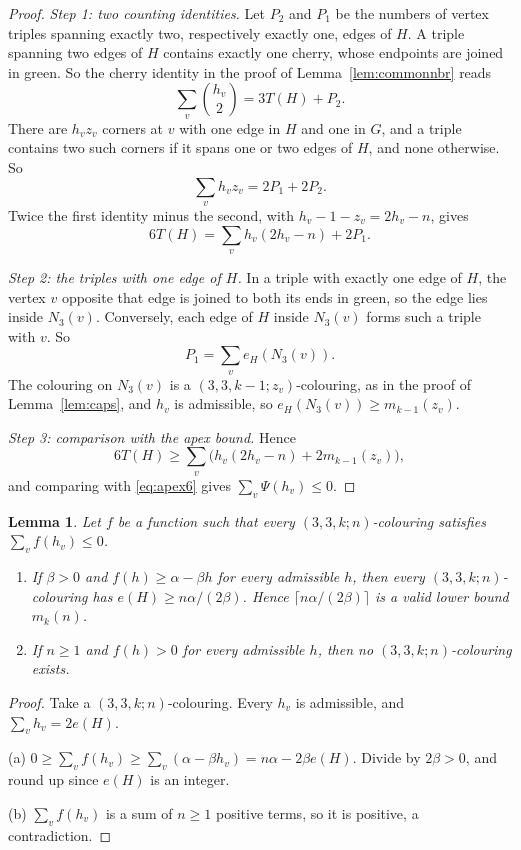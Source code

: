\documentclass[11pt]{article}
\theoremstyle{spacedplain}
\newtheorem{lemma}[theorem]{Lemma}
\theoremstyle{spaceddef}
\theoremstyle{spacedremark}
\begin{document}
\begin{proof}
\emph{Step 1: two counting identities.}
Let $P_2$ and $P_1$ be the numbers of vertex triples spanning exactly two, respectively exactly one, edges of $H$.
A triple spanning two edges of $H$ contains exactly one cherry, whose endpoints are joined in green.
So the cherry identity in the proof of Lemma~\ref{lem:commonnbr} reads
\[
\sum_v\binom{h_v}2=3T(H)+P_2.
\]
There are $h_vz_v$ corners at $v$ with one edge in $H$ and one in $G$, and a triple contains two such corners if it spans one or two edges of $H$, and none otherwise.
So
\[
\sum_vh_vz_v=2P_1+2P_2.
\]
Twice the first identity minus the second, with $h_v-1-z_v=2h_v-n$, gives
\[
6T(H)=\sum_vh_v(2h_v-n)+2P_1 .
\]

\emph{Step 2: the triples with one edge of $H$.}
In a triple with exactly one edge of $H$, the vertex $v$ opposite that edge is joined to both its ends in green, so the edge lies inside $N_3(v)$.
Conversely, each edge of $H$ inside $N_3(v)$ forms such a triple with $v$.
So
\[
P_1=\sum_ve_H(N_3(v)).
\]
The colouring on $N_3(v)$ is a $(3,3,k-1;z_v)$-colouring, as in the proof of Lemma~\ref{lem:caps}, and $h_v$ is admissible, so $e_H(N_3(v))\ge m_{k-1}(z_v)$.

\emph{Step 3: comparison with the apex bound.}
Hence
\[
6T(H)\ge\sum_v\big(h_v(2h_v-n)+2m_{k-1}(z_v)\big),
\]
and comparing with \eqref{eq:apex6} gives $\sum_v\Psi(h_v)\le 0$.
\end{proof}

\begin{lemma}\label{lem:line}
Let $f$ be a function such that every $(3,3,k;n)$-colouring satisfies $\sum_vf(h_v)\le 0$.
\begin{enumerate}[label=(\alph*)]
\item If $\beta>0$ and $f(h)\ge\alpha-\beta h$ for every admissible $h$, then every $(3,3,k;n)$-colouring has $e(H)\ge n\alpha/(2\beta)$.
Hence $\lceil n\alpha/(2\beta)\rceil$ is a valid lower bound $m_k(n)$.
\item If $n\ge 1$ and $f(h)>0$ for every admissible $h$, then no $(3,3,k;n)$-colouring exists.
\end{enumerate}
\end{lemma}

\begin{proof}
Take a $(3,3,k;n)$-colouring.
Every $h_v$ is admissible, and $\sum_vh_v=2e(H)$.

(a) $0\ge\sum_vf(h_v)\ge\sum_v(\alpha-\beta h_v)=n\alpha-2\beta e(H)$.
Divide by $2\beta>0$, and round up since $e(H)$ is an integer.

(b) $\sum_vf(h_v)$ is a sum of $n\ge 1$ positive terms, so it is positive, a contradiction.
\end{proof}
\end{document}
